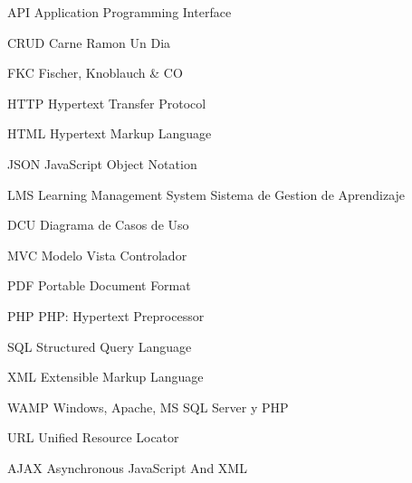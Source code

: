 	{API}
	{Application Programming Interface}

	{CRUD}
	{Carne Ramon Un Dia}

	{FKC}
	{Fischer, Knoblauch \& CO}

	{HTTP}
	{Hypertext Transfer Protocol}

	{HTML}
	{Hypertext Markup Language}

	{JSON}
	{JavaScript Object Notation}

	{LMS}
	{Learning Management System Sistema de Gestion de Aprendizaje}

	{DCU}
	{Diagrama de Casos de Uso}

	{MVC}
	{Modelo Vista Controlador}

	{PDF}
	{Portable Document Format}

	{PHP}
	{PHP: Hypertext Preprocessor}

	{SQL}
	{Structured Query Language}

	{XML}
	{Extensible Markup Language}

	{WAMP}
	{Windows, Apache, MS SQL Server y PHP}

	{URL}
	{Unified Resource Locator}

	{AJAX}
	{Asynchronous JavaScript And XML}
